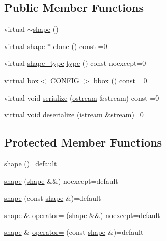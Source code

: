 \subsection*{Public Member Functions}
\begin{DoxyCompactItemize}
\item 
virtual \hyperlink{classmui_1_1geometry_1_1shape_a693b2265e6ffc817abb1a441b486f6b3}{$\sim$shape} ()
\item 
virtual \hyperlink{classmui_1_1geometry_1_1shape}{shape} $\ast$ \hyperlink{classmui_1_1geometry_1_1shape_a4d1307ebc40d462b13da89c811b3beb7}{clone} () const =0
\item 
virtual \hyperlink{namespacemui_1_1geometry_a5f311a343181e2f20482e5c9afb0f136}{shape\+\_\+type} \hyperlink{classmui_1_1geometry_1_1shape_a4a0fe17b8ca5cc29e260cb38c9fcf8fe}{type} () const noexcept=0
\item 
virtual \hyperlink{classmui_1_1geometry_1_1box}{box}$<$ C\+O\+N\+F\+IG $>$ \hyperlink{classmui_1_1geometry_1_1shape_adf598ec651ea425553bd8e617cac7430}{bbox} () const =0
\item 
virtual void \hyperlink{classmui_1_1geometry_1_1shape_ab1b2e763113b96dd0ae3deedfa0e7d22}{serialize} (\hyperlink{classmui_1_1ostream}{ostream} \&stream) const =0
\item 
virtual void \hyperlink{classmui_1_1geometry_1_1shape_ae68c7e1a1ae362abec52edad5489a1a9}{deserialize} (\hyperlink{classmui_1_1istream}{istream} \&stream)=0
\end{DoxyCompactItemize}
\subsection*{Protected Member Functions}
\begin{DoxyCompactItemize}
\item 
\hyperlink{classmui_1_1geometry_1_1shape_ae4242c4894c84a49d8ada49c7bbe0b4b}{shape} ()=default
\item 
\hyperlink{classmui_1_1geometry_1_1shape_adba3ac3cd94ee57a50f8ac6a23e22da6}{shape} (\hyperlink{classmui_1_1geometry_1_1shape}{shape} \&\&) noexcept=default
\item 
\hyperlink{classmui_1_1geometry_1_1shape_aa543de09ace275adebd093acdb69ad22}{shape} (const \hyperlink{classmui_1_1geometry_1_1shape}{shape} \&)=default
\item 
\hyperlink{classmui_1_1geometry_1_1shape}{shape} \& \hyperlink{classmui_1_1geometry_1_1shape_a01032c60e8387c88293d1dec04d27299}{operator=} (\hyperlink{classmui_1_1geometry_1_1shape}{shape} \&\&) noexcept=default
\item 
\hyperlink{classmui_1_1geometry_1_1shape}{shape} \& \hyperlink{classmui_1_1geometry_1_1shape_a16b649150ac5c7a6250cf89a646b6470}{operator=} (const \hyperlink{classmui_1_1geometry_1_1shape}{shape} \&)=default
\end{DoxyCompactItemize}


